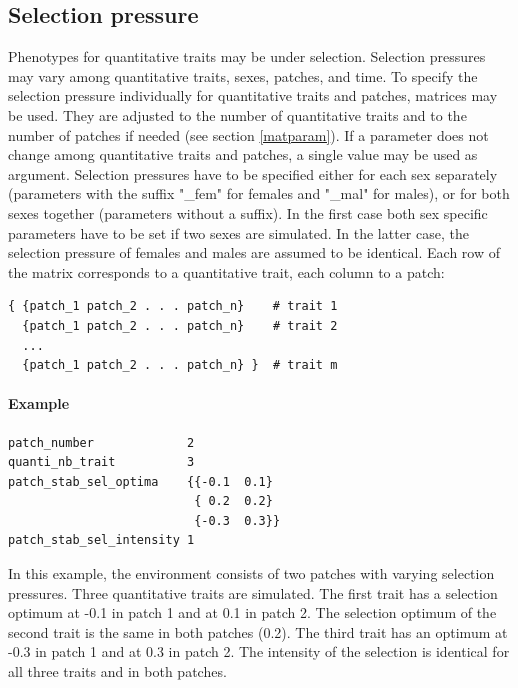 \documentclass[letterpaper,12pt,oneside]{book}
\begin{document}
\begin{appendices}
\section{Selection pressure}\label{selPressure}
Phenotypes for quantitative traits may be under selection. Selection pressures may vary among quantitative traits, sexes, patches, and time. To specify the selection pressure individually for quantitative traits and patches, matrices may be used. They are adjusted to the number of quantitative traits and to the number of patches if needed (see section \ref{matparam}). If a parameter does not change among quantitative traits and patches, a single value may be used as argument. Selection pressures have to be specified either for each sex separately (parameters with the suffix "\_fem" for females and "\_mal" for males), or for both sexes together (parameters without a suffix). In the first case both sex specific parameters have to be set if two sexes are simulated. In the latter case, the selection pressure of females and males are assumed to be identical. Each row of the matrix corresponds to a quantitative trait, each column to a patch:
\begin{lstlisting}[frame=single]
{ {patch_1 patch_2 . . . patch_n}    # trait 1
  {patch_1 patch_2 . . . patch_n}    # trait 2
  ...
  {patch_1 patch_2 . . . patch_n} }  # trait m
\end{lstlisting}

\paragraph{Example}\hspace*{\fill}
\begin{lstlisting}[frame=single]
patch_number             2
quanti_nb_trait          3
patch_stab_sel_optima    {{-0.1  0.1}                            
                          { 0.2  0.2}
                          {-0.3  0.3}}    
patch_stab_sel_intensity 1                                                    
\end{lstlisting}
In this example, the environment consists of two patches with varying selection pressures. Three quantitative traits are simulated. The first trait has a selection optimum at -0.1 in patch 1 and at 0.1 in patch 2. The selection optimum of the second trait is the same in both patches (0.2). The third trait has an optimum at -0.3 in patch 1 and at 0.3 in patch 2. The intensity of the selection is identical for all three traits and in both patches.    



\end{appendices}
\end{document}
